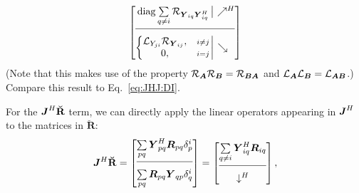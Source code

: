 \documentclass[useAMS,usenatbib]{mn2e}
\makeatletter
\newcommand{\mat}[1]{{\bmath{#1}}}
\newcommand{\JJ}{\mat{J}} %
\newcommand{\RR}{\mat{R}}
\newcommand{\Matrix}[2]{\left [ \begin{array}{@{}#1@{}}#2\end{array} \right ]}
\newcommand{\Stack}[1]{\begin{array}{@{}c@{}}#1\end{array}}
\newcommand{\AUGx}[1]{\mathbf{\breve{#1}}}
\newcommand{\RRr}{\AUGx{R}}
\newcommand{\Rop}[1]{\mathcal{R}_{{#1}}}
\newcommand{\Lop}[1]{\mathcal{L}_{{#1}}}
\numberwithin{equation}{section} %
\providecommand{\DIFaddbegin}{} %
\providecommand{\DIFaddend}{} %
\providecommand{\DIFdelbegin}{} %
\providecommand{\DIFdelend}{} %
\makeatother
\begin{document}
\begin{equation}%
\DIFdelend \DIFaddbegin \JHJblocks{
  \mathrm{diag}\sum\limits_{q\ne i} \Rop{\YY_{iq} \YY^H_{iq}} 
}{
  \left \{ 
  \begin{array}{@{}cc@{}}
   \Lop{ Y_{ji}  } \Rop{\YY_{ij}},&{\scriptstyle i\ne j} \\
   0, &{\scriptstyle i=j}
  \end{array} \right . 
}
\end{equation}
(Note that this makes use of the property $\Rop{\mat{A}}\Rop{\mat{B}}=\Rop{\mat{BA}}$ and 
$\Lop{\mat{A}}\Lop{\mat{B}}=\Lop{\mat{AB}}$.) Compare this result to Eq.~\ref{eq:JHJ:DI}.

For the $\JJ^H\RRr$ term, we can directly apply the linear operators appearing in $\JJ^H$ 
to the matrices in $\RRr$:
\begin{equation}
\JJ^H\RRr = \Matrix{c}{ 
\sum\limits_{pq} \YY^H_{pq} \RR_{pq} \delta^{i}_p  \\
\hline\\[-8pt]
\sum\limits_{pq} \RR_{pq} \YY_{qp} \delta^{i}_q 
} = \Matrix{c}{
\sum\limits_{q\ne i} \YY^H_{iq} \RR_{iq} \\
\hline\\[-8pt]
\downarrow^H
},
\DIFaddend \end{equation}
\DIFdelbegin %
\end{document}
